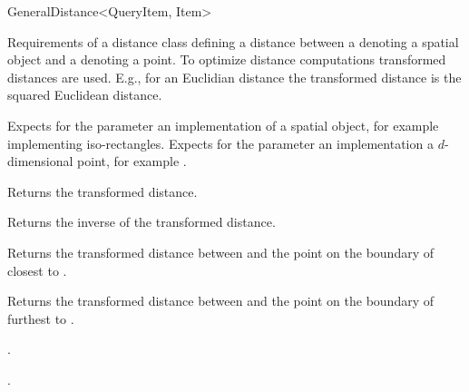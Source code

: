 

\begin{ccRefConcept}{GeneralDistance<QueryItem, Item>}


\ccDefinition

Requirements of a distance class defining a distance between a 
denoting a spatial object and a  denoting a point.
To optimize distance computations transformed distances are used.
E.g., for an Euclidian distance the transformed distance is the squared Euclidean distance.

\ccParameters

Expects for the parameter  an implementation of a spatial object, for
example  implementing iso-rectangles.
Expects for the parameter  an implementation a $d$-dimensional point, 
for example .

\ccTypes


\ccCreation
{}  %



 {Returns the transformed distance.}

 {Returns the inverse of the transformed distance.}


{Returns the transformed distance between  and
the point on the boundary of  closest to .}

{Returns the transformed distance between  and
the point on the boundary of  furthest to .}

\ccHasModels

.

\ccSeeAlso

.

\end{ccRefConcept}


